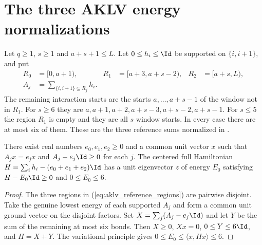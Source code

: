 \section{The three AKLV energy normalizations}

\begin{definition}
    \label{def:aklv_normalization_regions}
    \leanok
    Let $q\ge1$, $s\ge1$ and $a+s+1\le L$. Let $0\le h_i\le\Id$ be
    supported on $\{i,i+1\}$, and put
    \begin{align}
        R_0 & ={\lbrack 0,a+1)},                 & R_1 & ={\lbrack a+3,a+s-2)}, & R_2 & ={\lbrack a+s,L)},
        \label{eq:aklv_reference_regions}                                                                  \\
        A_j & =\sum_{\{i,i+1\}\subseteq R_j}h_i.
        \label{eq:aklv_reference_sums}
    \end{align}
    The remaining interaction starts are the starts $a,\ldots,a+s-1$ of
    the window not in $R_1$. For $s\ge6$ they are
    $a,a+1,a+2,a+s-3,a+s-2,a+s-1$. For $s\le5$ the region $R_1$ is
    empty and they are all $s$ window starts. In every case there are at
    most six of them.
    These are the three reference sums normalized in
    \cite[Section~6.1, before (5)]{Arad2013AreaLaw}.
\end{definition}

\begin{lemma}
    \label{thm:aklv_energy_normalization}
    \leanok
    There exist real numbers $e_0,e_1,e_2\ge0$ and a common unit vector $x$
    such that $A_jx=e_jx$ and $A_j-e_j\Id\ge0$ for each $j$.
    The centered full Hamiltonian
    $H=\sum_i h_i-(e_0+e_1+e_2)\Id$ has a unit eigenvector $z$ of
    energy $E_0$ satisfying $H-E_0\Id\ge0$ and $0\le E_0\le6$.
\end{lemma}
\begin{proof}
    \leanok
    The three regions in (\ref{eq:aklv_reference_regions}) are pairwise disjoint.
    Take the genuine lowest energy of each supported $A_j$ and form a common
    unit ground vector on the disjoint factors. Set
    $X=\sum_j(A_j-e_j\Id)$ and let $Y$ be the sum of the remaining at most six bonds.
    Then $X\ge0$, $Xx=0$, $0\le Y\le6\Id$, and $H=X+Y$.
    The variational principle gives $0\le E_0\le\langle x,Hx\rangle\le6$.
\end{proof}

